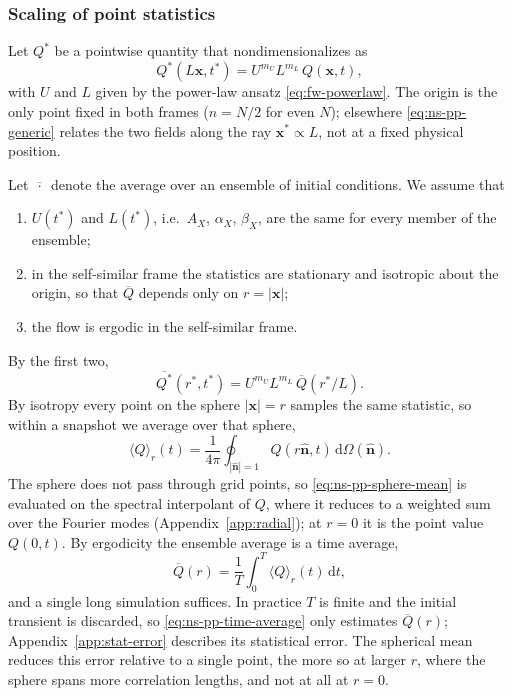 \documentclass{article}
\begin{document}
\subsubsection{Scaling of point statistics}\label{sssec:ns-pp-scaling}
Let $Q^*$ be a pointwise quantity that nondimensionalizes as
\begin{equation}\label{eq:ns-pp-generic}
  Q^*(L\mathbf{x}, t^*) = U^{m_U} L^{m_L}\, Q(\mathbf{x}, t),
\end{equation}
with $U$ and $L$ given by the power-law ansatz \eqref{eq:fw-powerlaw}. The
origin is the only point fixed in both frames ($n = N/2$ for even $N$);
elsewhere \eqref{eq:ns-pp-generic} relates the two fields along the ray
$\mathbf{x}^* \propto L$, not at a fixed physical position.
\par
Let $\overline{\,\cdot\,}$ denote the average over an ensemble of initial
conditions. We assume that
\begin{enumerate}
  \item $U(t^*)$ and $L(t^*)$, i.e.\ $A_X$, $\alpha_X$, $\beta_X$, are the
  same for every member of the ensemble;
  \item in the self-similar frame the statistics are stationary and isotropic
  about the origin, so that $\overline{Q}$ depends only on $r = |\mathbf{x}|$;
  \item the flow is ergodic in the self-similar frame.
\end{enumerate}
By the first two,
\begin{equation}\label{eq:ns-pp-ensemble-radial}
  \overline{Q^*}(r^*, t^*) = U^{m_U} L^{m_L}\, \overline{Q}(r^*/L) .
\end{equation}
By isotropy every point on the sphere $|\mathbf{x}| = r$ samples the same
statistic, so within a snapshot we average over that sphere,
\begin{equation}\label{eq:ns-pp-sphere-mean}
  \langle Q \rangle_r(t) = \frac{1}{4\pi} \oint_{|\hat{\mathbf{n}}| = 1}
  Q(r \hat{\mathbf{n}}, t)\, \mathrm{d}\Omega(\hat{\mathbf{n}}).
\end{equation}
The sphere does not pass through grid points, so
\eqref{eq:ns-pp-sphere-mean} is evaluated on the spectral interpolant of $Q$,
where it reduces to a weighted sum over the Fourier modes
(Appendix~\ref{app:radial}); at $r = 0$ it is the point value $Q(0, t)$. By
ergodicity the ensemble average is a time average,
\begin{equation}\label{eq:ns-pp-time-average}
  \overline{Q}(r) = \frac{1}{T}\int_0^T \langle Q \rangle_r(t)\, \mathrm{d}t,
\end{equation}
and a single long simulation suffices. In practice $T$ is finite and the
initial transient is discarded, so \eqref{eq:ns-pp-time-average} only
estimates $\overline{Q}(r)$; Appendix~\ref{app:stat-error} describes its
statistical error. The spherical mean reduces this error relative to a single
point, the more so at larger $r$, where the sphere spans more correlation
lengths, and not at all at $r = 0$.
\end{document}
